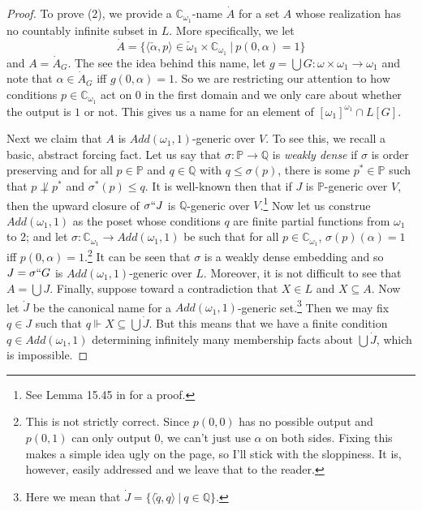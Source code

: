 \documentclass[10pt,a4paper]{amsart}
\numberwithin{equation}{section}
\numberwithin{figure}{section}
\theoremstyle{plain}
\theoremstyle{plain}
\theoremstyle{plain}
\theoremstyle{plain}
\theoremstyle{remark}
\theoremstyle{plain}
\theoremstyle{definition}
\begin{document}
\begin{proof}
To prove (2), we provide a $\mathbb{C}_{\omega_{1}}$-name $\dot{A}$
for a set $A$ whose realization has no countably infinite subset
in $L$. More specifically, we let 
\[
\dot{A}=\{\langle\check{\alpha},p\rangle\in\check{\omega}_{1}\times\mathbb{C}_{\omega_{1}}\ |\ p(0,\alpha)=1\}
\]
and $A=\dot{A}_{G}$. The see the idea behind this name, let $g=\bigcup G:\omega\times\omega_{1}\to\omega_{1}$
and note that $\alpha\in\dot{A}_{G}$ iff $g(0,\alpha)=1$. So we
are restricting our attention to how conditions $p\in\mathbb{C}_{\omega_{1}}$
act on $0$ in the first domain and we only care about whether the
output is $1$ or not. This gives us a name for an element of $[\omega_{1}]^{\omega_{1}}\cap L[G]$.

Next we claim that $A$ is $Add(\omega_{1},1)$-generic over $V$.
To see this, we recall a basic, abstract forcing fact. Let us say
that $\sigma:\mathbb{P}\to\mathbb{Q}$ is \emph{weakly dense} if $\sigma$
is order preserving and for all $p\in\mathbb{P}$ and $q\in\mathbb{Q}$
with $q\leq\sigma(p)$, there is some $p^{*}\in\mathbb{P}$ such that
$p\not\perp p^{*}$ and $\sigma^{*}(p)\leq q$. It is well-known then
that if $J$ is $\mathbb{P}$-generic over $V$, then the upward closure
of $\sigma``J$ is $\mathbb{Q}$-generic over $V$.\footnote{See Lemma 15.45 in \citep{JechST} for a proof.}
Now let us construe $Add(\omega_{1},1)$ as the poset whose conditions
$q$ are finite partial functions from $\omega_{1}$ to $2$; and
let $\sigma:\mathbb{C}_{\omega_{1}}\to Add(\omega_{1},1)$ be such
that for all $p\in\mathbb{C}_{\omega_{1}}$, $\sigma(p)(\alpha)=1$
iff $p(0,\alpha)=1$.\footnote{This is not strictly correct. Since $p(0,0)$ has no possible output
and $p(0,1)$ can only output $0$, we can't just use $\alpha$ on
both sides. Fixing this makes a simple idea ugly on the page, so I'll
stick with the sloppiness. It is, however, easily addressed and we
leave that to the reader.} It can be seen that $\sigma$ is a weakly dense embedding and so
$J=\sigma``G$ is $Add(\omega_{1},1)$-generic over $L$. Moreover,
it is not difficult to see that $A=\bigcup J$. Finally, suppose toward
a contradiction that $X\in L$ and $X\subseteq A$. Now let $\dot{J}$
be the canonical name for a $Add(\omega_{1},1)$-generic set.\footnote{Here we mean that $\dot{J}=\{\langle\check{q},q\rangle\ |\ q\in\mathbb{Q}\}$.}
Then we may fix $q\in J$ such that $q\Vdash X\subseteq\bigcup\dot{J}$.
But this means that we have a finite condition $q\in Add(\omega_{1},1)$
determining infinitely many membership facts about $\bigcup\dot{J}$,
which is impossible.
\end{proof}
\end{document}
